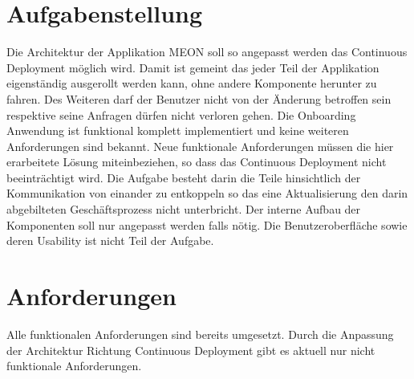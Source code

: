 \section{Aufgabenstellung}

Die Architektur der Applikation MEON soll so angepasst werden das Continuous Deployment möglich wird. Damit ist gemeint das jeder Teil der Applikation eigenständig ausgerollt werden kann, ohne andere Komponente herunter zu fahren. Des Weiteren darf der Benutzer nicht von der Änderung betroffen sein respektive seine Anfragen dürfen nicht verloren gehen.
Die Onboarding Anwendung ist funktional komplett implementiert und keine weiteren Anforderungen sind bekannt. Neue funktionale Anforderungen müssen die hier erarbeitete Lösung miteinbeziehen, so dass das Continuous Deployment nicht beeinträchtigt wird.
Die Aufgabe besteht darin die Teile hinsichtlich der Kommunikation von einander zu entkoppeln so das eine Aktualisierung den darin abgebilteten Geschäftsprozess nicht unterbricht.  Der interne Aufbau der Komponenten soll nur angepasst werden falls nötig. Die Benutzeroberfläche sowie deren Usability ist nicht Teil der Aufgabe.

\section{Anforderungen}

Alle funktionalen Anforderungen sind bereits umgesetzt. Durch die Anpassung der Architektur Richtung Continuous Deployment gibt es aktuell nur nicht funktionale Anforderungen.

